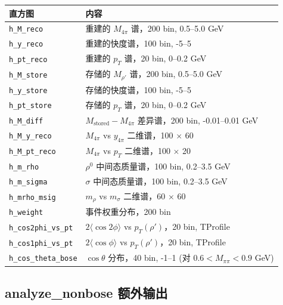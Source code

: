 \documentclass[11pt,a4paper,UTF8]{ctexart}
\begin{document}
\begin{longtable}{l p{9cm}}
\toprule
\textbf{直方图} & \textbf{内容} \\
\midrule
\texttt{h\_M\_reco} & 重建的 $M_{4\pi}$ 谱，200 bin, 0.5--5.0 GeV \\
\texttt{h\_y\_reco} & 重建的快度谱，100 bin, -5--5 \\
\texttt{h\_pt\_reco} & 重建的 $p_T$ 谱，20 bin, 0--0.2 GeV \\
\texttt{h\_M\_store} & 存储的 $M_{\rho'}$ 谱，200 bin, 0.5--5.0 GeV \\
\texttt{h\_y\_store} & 存储的快度谱，100 bin, -5--5 \\
\texttt{h\_pt\_store} & 存储的 $p_T$ 谱，20 bin, 0--0.2 GeV \\
\texttt{h\_M\_diff} & $M_{\text{stored}} - M_{4\pi}$ 差异谱，200 bin, -0.01--0.01 GeV \\
\texttt{h\_M\_y\_reco} & $M_{4\pi}$ vs $y_{4\pi}$ 二维谱，100 $\times$ 60 \\
\texttt{h\_M\_pt\_reco} & $M_{4\pi}$ vs $p_T$ 二维谱，100 $\times$ 20 \\
\texttt{h\_m\_rho} & $\rho^0$ 中间态质量谱，100 bin, 0.2--3.5 GeV \\
\texttt{h\_m\_sigma} & $\sigma$ 中间态质量谱，100 bin, 0.2--3.5 GeV \\
\texttt{h\_mrho\_msig} & $m_\rho$ vs $m_\sigma$ 二维谱，60 $\times$ 60 \\
\texttt{h\_weight} & 事件权重分布，200 bin \\
\texttt{h\_cos2phi\_vs\_pt} & $2\langle\cos 2\phi\rangle$ vs $p_T(\rho')$，20 bin, TProfile \\
\texttt{h\_cos1phi\_vs\_pt} & $2\langle\cos\phi\rangle$ vs $p_T(\rho')$，20 bin, TProfile \\
\texttt{h\_cos\_theta\_bose} & $\cos\theta$ 分布，40 bin, -1--1 (对 $0.6 < M_{\pi\pi} < 0.9$ GeV) \\
\bottomrule
\end{longtable}

\subsection{analyze\_nonbose 额外输出}
\end{document}
